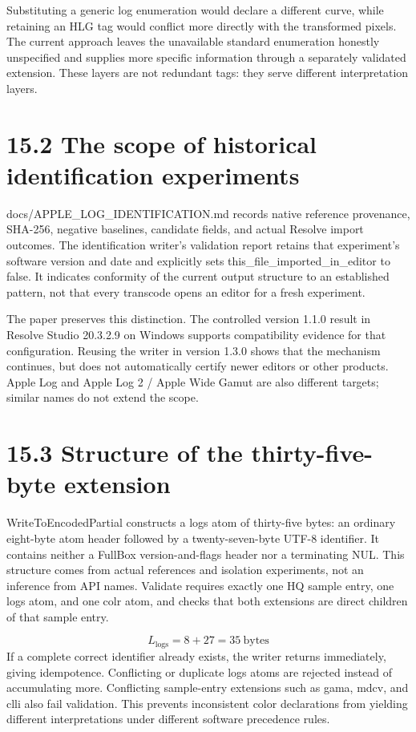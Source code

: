 \documentclass[11pt,a4paper,openany]{book}
\begin{document}
Substituting a generic log enumeration would declare a different curve, while retaining an HLG tag would conflict more directly with the transformed pixels. The current approach leaves the unavailable standard enumeration honestly unspecified and supplies more specific information through a separately validated extension. These layers are not redundant tags: they serve different interpretation layers.


\section*{15.2 The scope of historical identification experiments}
docs/APPLE\_LOG\_IDENTIFICATION.md records native reference provenance, SHA-256, negative baselines, candidate fields, and actual Resolve import outcomes. The identification writer's validation report retains that experiment's software version and date and explicitly sets this\_file\_imported\_in\_editor to false. It indicates conformity of the current output structure to an established pattern, not that every transcode opens an editor for a fresh experiment.

The paper preserves this distinction. The controlled version 1.1.0 result in Resolve Studio 20.3.2.9 on Windows supports compatibility evidence for that configuration. Reusing the writer in version 1.3.0 shows that the mechanism continues, but does not automatically certify newer editors or other products. Apple Log and Apple Log 2 / Apple Wide Gamut are also different targets; similar names do not extend the scope.


\section*{15.3 Structure of the thirty-five-byte extension}
WriteToEncodedPartial constructs a logs atom of thirty-five bytes: an ordinary eight-byte atom header followed by a twenty-seven-byte UTF-8 identifier. It contains neither a FullBox version-and-flags header nor a terminating NUL. This structure comes from actual references and isolation experiments, not an inference from API names. Validate requires exactly one HQ sample entry, one logs atom, and one colr atom, and checks that both extensions are direct children of that sample entry.


\begin{equation}
L_{\mathrm{logs}}=8+27=35\ \mathrm{bytes}
\end{equation}
If a complete correct identifier already exists, the writer returns immediately, giving idempotence. Conflicting or duplicate logs atoms are rejected instead of accumulating more. Conflicting sample-entry extensions such as gama, mdcv, and clli also fail validation. This prevents inconsistent color declarations from yielding different interpretations under different software precedence rules.
\end{document}

